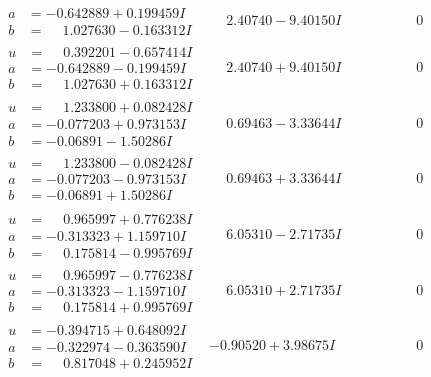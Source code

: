 \documentclass[1p]{elsarticle_modified}
\theoremstyle{definition}
\begin{document}
$$\begin{array}{c|c|c}
\begin{aligned}
a &= -0.642889 + 0.199459 I \\
b &= \phantom{-}1.027630 - 0.163312 I\end{aligned}
 & \phantom{-}2.40740 - 9.40150 I & \phantom{-0.000000 } 0 \\ \hline\begin{aligned}
u &= \phantom{-}0.392201 - 0.657414 I \\
a &= -0.642889 - 0.199459 I \\
b &= \phantom{-}1.027630 + 0.163312 I\end{aligned}
 & \phantom{-}2.40740 + 9.40150 I & \phantom{-0.000000 } 0 \\ \hline\begin{aligned}
u &= \phantom{-}1.233800 + 0.082428 I \\
a &= -0.077203 + 0.973153 I \\
b &= -0.06891 - 1.50286 I\end{aligned}
 & \phantom{-}0.69463 - 3.33644 I & \phantom{-0.000000 } 0 \\ \hline\begin{aligned}
u &= \phantom{-}1.233800 - 0.082428 I \\
a &= -0.077203 - 0.973153 I \\
b &= -0.06891 + 1.50286 I\end{aligned}
 & \phantom{-}0.69463 + 3.33644 I & \phantom{-0.000000 } 0 \\ \hline\begin{aligned}
u &= \phantom{-}0.965997 + 0.776238 I \\
a &= -0.313323 + 1.159710 I \\
b &= \phantom{-}0.175814 - 0.995769 I\end{aligned}
 & \phantom{-}6.05310 - 2.71735 I & \phantom{-0.000000 } 0 \\ \hline\begin{aligned}
u &= \phantom{-}0.965997 - 0.776238 I \\
a &= -0.313323 - 1.159710 I \\
b &= \phantom{-}0.175814 + 0.995769 I\end{aligned}
 & \phantom{-}6.05310 + 2.71735 I & \phantom{-0.000000 } 0 \\ \hline\begin{aligned}
u &= -0.394715 + 0.648092 I \\
a &= -0.322974 - 0.363590 I \\
b &= \phantom{-}0.817048 + 0.245952 I\end{aligned}
 & -0.90520 + 3.98675 I & \phantom{-0.000000 } 0 \\ \hline\begin{aligned}

\end{aligned}
\end{array}$$
\end{document}
